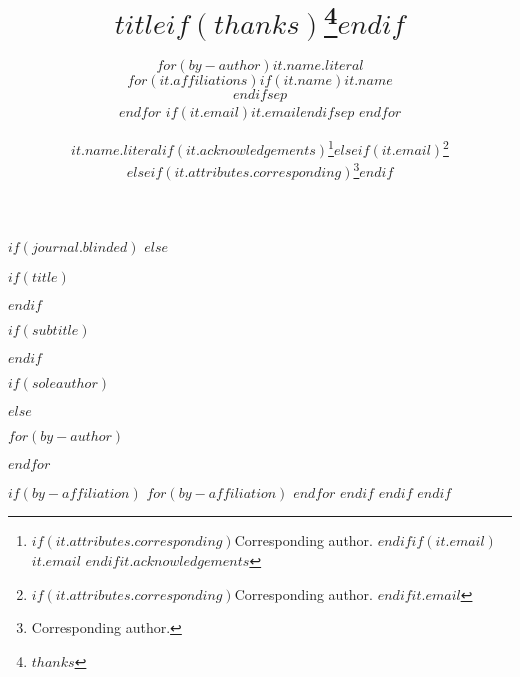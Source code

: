 $if(journal.blinded)$
$else$

  $if(title)$\title{$title$$if(thanks)$\thanks{$thanks$}$endif$}$endif$
  
  $if(subtitle)$
    \usepackage{etoolbox}
    \makeatletter
      \providecommand{\subtitle}[1]{\apptocmd{\@title}{\par {\large #1 \par}}{}{}}
    \makeatother
    
    \subtitle{$subtitle$}
  $endif$
  
  $if(soleauthor)$
    \author{$for(by-author)$$it.name.literal$ \\ $for(it.affiliations)$$if(it.name)$$it.name$ \\$endif$$sep$ \\$endfor$ $if(it.email)$$it.email$$endif$$sep$ $endfor$}
  $else$
    \setlength{\affilsep}{1em}
    
    $for(by-author)$
      \author[$if(it.affiliations)$$for(it.affiliations)$$it.number$$sep$,$endfor$$endif$]{$it.name.literal$$if(it.acknowledgements)$\thanks{$if(it.attributes.corresponding)$Corresponding author. $endif$$if(it.email)$$it.email$ $endif$$it.acknowledgements$}$elseif(it.email)$\thanks{$if(it.attributes.corresponding)$Corresponding author. $endif$$it.email$}$elseif(it.attributes.corresponding)$\thanks{Corresponding author.}$endif$}
    $endfor$
    
    $if(by-affiliation)$
      $for(by-affiliation)$
      $endfor$
    $endif$
  $endif$
$endif$

\usepackage{subcaption}

